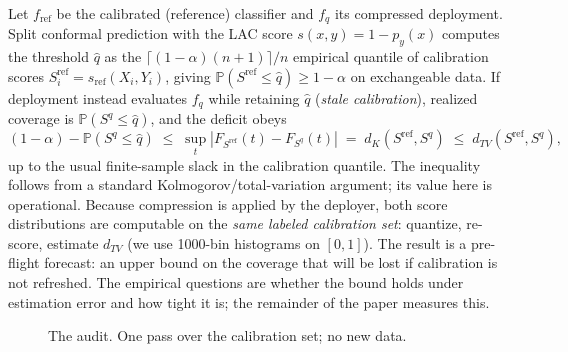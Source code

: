 \documentclass[11pt]{article}
\begin{document}
Let $f_{\mathrm{ref}}$ be the calibrated (reference) classifier and
$f_{q}$ its compressed deployment. Split conformal prediction with the LAC
score $s(x,y) = 1 - p_y(x)$ computes the threshold $\hat{q}$ as the
$\lceil (1-\alpha)(n+1)\rceil/n$ empirical quantile of calibration scores
$S^{\mathrm{ref}}_i = s_{\mathrm{ref}}(X_i, Y_i)$, giving
$\mathbb{P}(S^{\mathrm{ref}} \le \hat{q}) \ge 1-\alpha$ on exchangeable data.
If deployment instead evaluates $f_q$ while retaining $\hat q$ (\emph{stale
calibration}), realized coverage is $\mathbb{P}(S^{q} \le \hat{q})$, and the
deficit obeys
\begin{equation}
(1-\alpha) - \mathbb{P}(S^{q} \le \hat{q})
\;\le\; \sup_t \left| F_{S^{\mathrm{ref}}}(t) - F_{S^{q}}(t) \right|
\;=\; d_K(S^{\mathrm{ref}}, S^{q})
\;\le\; d_{TV}(S^{\mathrm{ref}}, S^{q}),
\label{eq:bound}
\end{equation}
up to the usual finite-sample slack in the calibration quantile. The inequality follows from a standard Kolmogorov/total-variation argument;
its value here is operational. Because compression
is applied by the deployer, both score distributions are computable on the
\emph{same labeled calibration set}: quantize, re-score, estimate
$d_{TV}$ (we use 1000-bin histograms on $[0,1]$). The result is a pre-flight
forecast: an upper bound on the coverage that will be lost if calibration is
not refreshed. The empirical questions are whether the bound holds under
estimation error and how tight it is; the remainder of the paper measures
this.

\begin{figure}[t]
\centering
{}
\caption{The audit. One pass over the calibration set; no new data.}
\label{fig:proto}
\end{figure}
\end{document}
